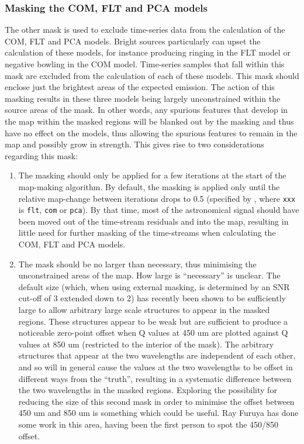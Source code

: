 \documentclass[twoside,11pt]{starlink}
\begin{document}
\subsubsection{Masking the COM, FLT and PCA models}
The other mask is used to exclude time-series data from the calculation
of the COM, FLT and PCA models. Bright sources particularly can upset the
calculation of these models, for instance producing ringing in the FLT
model or negative bowling in the COM model. Time-series samples that fall
within this mask are excluded from the calculation of each of these
models. This mask should enclose just the brightest areas of the expected
emission. The action of this masking results in these three models being
largely unconstrained within the source areas of the mask. In other words, any
spurious features that develop in the map within the masked regions will be
blanked out by the masking and thus have no effect on the models, thus
allowing the spurious features to remain in the map and possibly grow in
strength. This gives rise to two considerations regarding this mask:

\begin{enumerate}
\item The masking should only be applied for a few iterations at the
start of the map-making algorithm. By default, the masking is applied
only until the relative map-change between iterations drops to 0.5
(specified by , where \texttt{xxx} is \texttt{flt},
\texttt{com} or \texttt{pca}). By that time, most of the astronomical
signal should have been moved out of the time-stream residuals and into
the map, resulting in little need for further masking of the time-streams
when calculating the COM, FLT and PCA models.

\item The mask should be no larger than necessary, thus minimising the
unconstrained areas of the map. How large is ``necessary'' is unclear.
The default size (which, when using external masking, is determined by an
SNR cut-off of 3 extended down to 2) has recently been shown to be
sufficiently large to allow arbitrary large scale structures to appear in
the masked regions. These structures appear to be weak but are
sufficient to produce a noticeable zero-point offset when Q values at 450
um are plotted against Q values at 850 um (restricted to the interior of
the mask). The arbitrary structures that appear at the two wavelengths are
independent of each other, and so will in general cause the values at the
two wavelengths to be offset in different ways from the ``truth'',
resulting in a systematic difference between the two wavelengths in the
masked regions. Exploring the possibility for reducing the size of this
second mask in order to minimise the offset between 450 um and 850 um is
something which could be useful. Ray Furuya has done some work in this
area, having been the first person to spot the 450/850 offset.
\end{enumerate}
\end{document}
